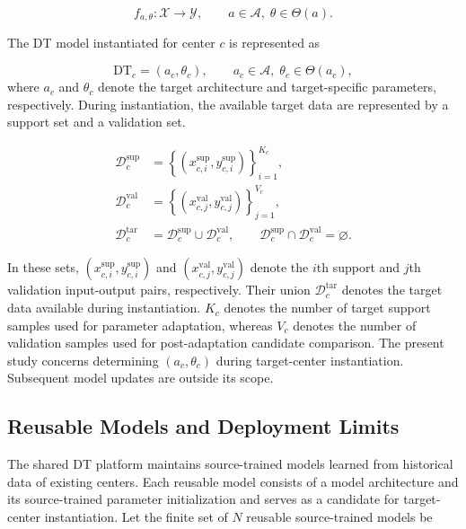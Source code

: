 \documentclass[a4paper,fleqn]{cas-sc}
\begin{document}
\begin{equation}
f_{a,\theta}:\mathcal{X}\rightarrow\mathcal{Y},
\qquad
a\in\mathcal{A},\;
\theta\in\Theta(a).
\label{eq:model-family}
\end{equation}

The DT model instantiated for center $c$ is represented as

\begin{equation}
\mathrm{DT}_{c}
=
\left(
a_c,\theta_c
\right),
\qquad
a_c\in\mathcal{A},\;
\theta_c\in\Theta(a_c),
\label{eq:dt-instance}
\end{equation}
where \(a_c\) and \(\theta_c\) denote the target architecture and target-specific
parameters, respectively. During instantiation, the available target data are
represented by a support set and a validation set.

\begin{equation}
\begin{aligned}
\mathcal{D}_{c}^{\mathrm{sup}}
&=
\left\{
(x_{c,i}^{\mathrm{sup}},y_{c,i}^{\mathrm{sup}})
\right\}_{i=1}^{K_c},
\\
\mathcal{D}_{c}^{\mathrm{val}}
&=
\left\{
(x_{c,j}^{\mathrm{val}},y_{c,j}^{\mathrm{val}})
\right\}_{j=1}^{V_c},
\\
\mathcal{D}_{c}^{\mathrm{tar}}
&=
\mathcal{D}_{c}^{\mathrm{sup}}
\cup
\mathcal{D}_{c}^{\mathrm{val}},
\qquad
\mathcal{D}_{c}^{\mathrm{sup}}
\cap
\mathcal{D}_{c}^{\mathrm{val}}
=
\varnothing .
\end{aligned}
\label{eq:target-data}
\end{equation}

In these sets,
$(x_{c,i}^{\mathrm{sup}},y_{c,i}^{\mathrm{sup}})$ and
$(x_{c,j}^{\mathrm{val}},y_{c,j}^{\mathrm{val}})$ denote the $i$th support
and $j$th validation input-output pairs, respectively. Their union
$\mathcal{D}_{c}^{\mathrm{tar}}$ denotes the target data available during
instantiation. $K_c$ denotes the number of target support samples used for
parameter adaptation, whereas $V_c$ denotes the number of validation samples
used for post-adaptation candidate comparison. The present study concerns
determining $(a_c,\theta_c)$ during target-center instantiation. Subsequent
model updates are outside its scope.

\subsection{Reusable Models and Deployment Limits}

The shared DT platform maintains source-trained models learned from historical
data of existing centers. Each reusable model consists of a model architecture
and its source-trained parameter initialization and serves as a candidate for
target-center instantiation. Let the finite set of $N$ reusable source-trained
models be
\end{document}
